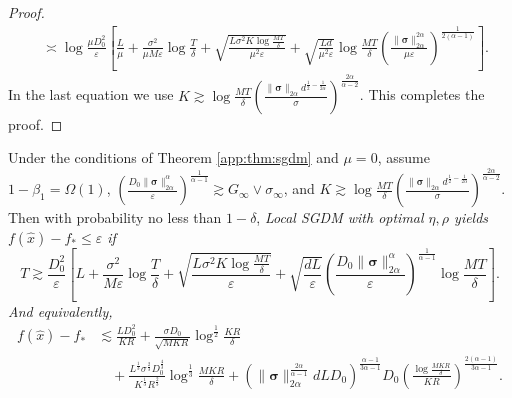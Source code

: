 \documentclass{article} %
\numberwithin{equation}{section}
\begin{document}
\begin{proof}
\begin{equation}
\begin{aligned}
            &\asymp \log\frac{\mu D_0^2}{\varepsilon}\left[\frac{L}{\mu}+\frac{\sigma^2}{\mu M \varepsilon}\log\frac{T}{\delta}+\sqrt{\frac{L\sigma^2K\log\frac{MT}{\delta}}{\mu^2\varepsilon}}+\sqrt{\frac{Ld}{\mu^2\varepsilon}}\log\frac{MT}{\delta}\left(\frac{\|\boldsymbol{\sigma}\|_{2\alpha}^{2\alpha}}{\mu\varepsilon}\right)^{\frac{1}{2(\alpha-1)}}\right].
        \end{aligned}
    \end{equation}
    In the last equation we use 
    $K\gtrsim \log\frac{MT}{\delta}\left(\frac{\|\boldsymbol{\sigma}\|_{2\alpha}d^{\frac{1}{2}-\frac{1}{2\alpha}}}{\sigma}\right)^{\frac{2\alpha}{\alpha-2}}$.
    This completes the proof.
\end{proof}

\begin{thm}\label{app:thm:sgdm_c}
    Under the conditions of Theorem \ref{app:thm:sgdm} and $\mu=0$, assume $1-\beta_1=\Omega(1)$, $\left(\frac{D_0\|\boldsymbol{\sigma}\|_{2\alpha}^{\alpha}}{\varepsilon}\right)^{\frac{1}{\alpha-1}}\gtrsim G_\infty\vee \sigma_\infty$, and $K\gtrsim \log\frac{MT}{\delta}\left(\frac{\|\boldsymbol{\sigma}\|_{2\alpha} d^{\frac{1}{2}-\frac{1}{2\alpha}}}{\sigma}\right)^{\frac{2\alpha}{\alpha-2}}$. Then with probability no less than $1-\delta$, \em Local \em SGDM with optimal $\eta, \rho$ yields $f(\hat{x})-f_*\leq \varepsilon$ if
    \begin{equation}
        T\gtrsim 
        \frac{D_0^2}{\varepsilon}\left[L+\frac{\sigma^2}{M \varepsilon}\log\frac{T}{\delta}+\sqrt{\frac{L\sigma^2K\log\frac{MT}{\delta}}{\varepsilon}} 
        + \sqrt{\frac{dL}{\varepsilon}}\left(\frac{D_0\|\boldsymbol{\sigma}\|_{2\alpha}^\alpha}{\varepsilon}\right)^{\frac{1}{\alpha-1}}\log\frac{MT}{\delta}\right].
    \end{equation}
    And equivalently,
    \begin{equation}
        \begin{aligned}
            f(\hat{x})-f_*
            &\lesssim \frac{LD_0^2}{KR} + \frac{\sigma D_0}{\sqrt{MKR}}\log^{\frac{1}{2}}\frac{KR}{\delta} \\
            &\quad + \frac{L^{\frac{1}{3}}\sigma^{\frac{2}{3}}D_0^{\frac{4}{3}}}{K^{\frac{1}{3}}R^{\frac{2}{3}}}\log^{\frac{1}{3}}\frac{MKR}{\delta}
            +\left(\|\boldsymbol{\sigma}\|_{2\alpha}^{\frac{2\alpha}{\alpha-1}}dLD_0\right)^{\frac{\alpha-1}{3\alpha-1}}D_0\left(\frac{\log\frac{MKR}{\delta}}{KR}\right)^{\frac{2(\alpha-1)}{3\alpha-1}}.
        \end{aligned}
    \end{equation}
\end{thm}
\end{document}
